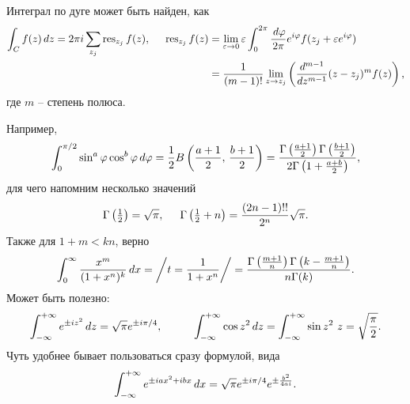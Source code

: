 
Интеграл по дуге может быть найден, как
\begin{align*}
    \int_C f(z) \, d z = 2 \pi i \sum_{z_j} \mathop{\mathrm{res}}\nolimits_{z_j} f(z),
    \hspace{5 mm} 
    \mathop{\mathrm{res}}\nolimits_{z_j} f(z) &= \lim_{\varepsilon \to 0} \varepsilon \int_0^{2\pi} \frac{\, d \varphi}{2\pi} e^{i \varphi} f(z_j + \varepsilon e^{i \varphi}) \\ 
    &= \frac{1}{(m-1)!} \lim_{z \to z_j} \left(
        \frac{d^{m-1} }{d z^{m-1}} (z-z_j)^m f(z)
    \right),
\end{align*}
где $m$ -- степень полюса. 



Например,
\begin{equation*}
    \int_0^{\pi/2} \sin^a \varphi \cos^b \varphi \, d \varphi =  \frac{1}{2} B\left(\frac{a+1}{2},\, \frac{b+1}{2}\right) = \frac{\Gamma\left(\frac{a+1}{2}\right) \Gamma\left(\frac{b+1}{2}\right)}{2 \Gamma\left(1 + \frac{a + b}{2}\right)},
\end{equation*}
для чего напомним несколько значений
\begin{equation*}
    \Gamma\left(\tfrac{1}{2}\right) = \sqrt{\pi},
    \hspace{5 mm} 
    \Gamma\left(\tfrac{1}{2}+n\right) = \frac{(2n-1)!!}{2^n}\sqrt{\pi}.
\end{equation*}
Также для $1 + m < kn$, верно
\begin{equation*}
    \int_{0}^{\infty}  \frac{x^m}{(1+x^n)^k} \, d x = \bigg/
        t = \frac{1}{1+x^n}
    \bigg/ = \frac{\Gamma \left(\frac{m+1}{n}\right) \Gamma \left(k-\frac{m+1}{n}\right)}{n \Gamma (k)}.
\end{equation*}
Может быть полезно:
\begin{equation*}
    \int_{-\infty}^{+\infty} e^{\pm i z^2} \d z = \sqrt{\pi} e^{\pm i \pi / 4},
    \hspace{10 mm} 
    \int_{-\infty}^{+\infty} \cos z^2 \d z = \int_{-\infty}^{+\infty} \sin z^2 \ z = \sqrt{\frac{\pi}{2}}.
\end{equation*}
Чуть удобнее бывает пользоваться сразу формулой, вида
\begin{equation*}
    \int_{-\infty}^{+\infty} e^{\pm i a x^2 + i b x} \, d x = \sqrt{\pi} e^{\pm i \pi/4} e^{\pm \frac{b^2}{4 a i}}.
\end{equation*}









